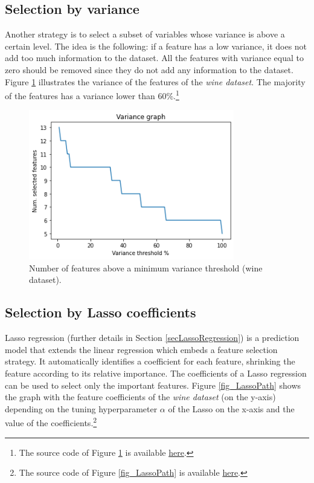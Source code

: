\subsection{Selection by variance}
Another strategy is to select a subset of variables whose variance is above a certain level. The idea is the following: if a feature has a low variance, it does not add too much information to the dataset. All the features with variance equal to zero should be removed since they do not add any information to the dataset. Figure \ref{fig_selectVariance} illustrates the variance of the features of the \textit{wine dataset}. The majority of the features has a variance lower than 60\%.\footnote{The source code of Figure \ref{fig_selectVariance} is available \href{https://github.com/aletuf93/logproj/blob/master/examples/05.\%20Dimensionality\%20Reduction.ipynb}{here}.}

\begin{figure}[hbt!]
\centering
\includegraphics[width=0.8\textwidth]{SectionLetsMath/dimensionalityReduction_figures/fig_selectVariance.png}
\captionsetup{type=table}
\caption{Number of features above a minimum variance threshold (wine dataset).}
\label{fig_selectVariance}
\end{figure}

\subsection{Selection by Lasso coefficients}
Lasso regression (further details in Section \ref{secLassoRegression}) is a prediction model that extends the linear regression which embeds a feature selection strategy. It automatically identifies a coefficient for each feature, shrinking the feature according to its relative importance. The coefficients of a Lasso regression can be used to select only the important features. Figure \ref{fig_LassoPath} shows the graph with the feature coefficients of the \textit{wine dataset} (on the y-axis) depending on the tuning hyperparameter $\alpha$ of the Lasso on the x-axis and the value of the coefficients.\footnote{The source code of Figure \ref{fig_LassoPath} is available \href{https://github.com/aletuf93/logproj/blob/master/examples/05.\%20Dimensionality\%20Reduction.ipynb}{here}.} 

